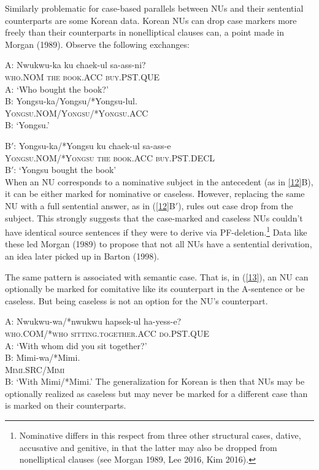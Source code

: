 \documentclass[output=paper
                ,modfonts
                ,nonflat
	        ,collection
	        ,collectionchapter
	        ,collectiontoclongg
 	        ,biblatex
                ,babelshorthands
                ,newtxmath
                ,draftmode
                ,colorlinks, citecolor=brown
]{./langsci/langscibook}
\begin{document}
{Similarly problematic for case-based parallels between NUs and their sentential counterparts are some Korean data. Korean NUs can drop case markers more freely than their counterparts in nonelliptical clauses can, a point made in Morgan (1989). Observe the following exchanges:

  \ea
A: \gll Nwukwu-ka ku  chaek-ul  sa-ass-ni?\\
\textsc{who.NOM} \textsc{the} \textsc{book.ACC} \textsc{buy.PST.QUE}\\
\glt A: `Who bought the book?'\\

B: \gll Yongsu-ka/Yongsu/*Yongsu-lul.\\
\textsc{Yongsu.NOM/Yongsu/*Yongsu.ACC}\\
\glt B: `Yongsu.'

B$'$: \gll Yongsu-ka/*Yongsu  ku  chaek-ul  sa-ass-e\\
\textsc{Yongsu.NOM/*Yongsu} \textsc{the} \textsc{book.ACC} \textsc{buy.PST.DECL}\\
\glt B$'$: `Yongsu bought the book'\\
\label{12}\z
%
When an NU corresponds to a nominative subject in the antecedent (as in \ref{12}B), it can be either marked for nominative or caseless.
However, replacing the same NU with a full sentential answer, as in (\ref{12}B$'$), rules out case drop from the subject. This strongly suggests that the case-marked and caseless NUs couldn't have identical source sentences if they were to derive via PF-deletion.\footnote{Nominative differs in this respect from three other structural cases, dative, accusative and genitive, in that the latter may also be dropped from nonelliptical clauses (see Morgan 1989, Lee 2016, Kim 2016).}  Data like these led Morgan (1989) to propose that not all NUs have a sentential derivation, an idea later picked up in Barton (1998).

The same pattern is associated with semantic case. That is, in (\ref{13}), an NU can optionally be marked for comitative like its counterpart in the A-sentence or be caseless. But being caseless is not an option for the NU's counterpart.

\ea
A: \gll Nwukwu-wa/*nwukwu  hapsek-ul ha-yess-e?\\
\textsc{who.COM/*who}  \textsc{sitting.together.ACC} \textsc{do.PST.QUE}\\
\glt A: `With whom did you sit together?'\\

B: \gll Mimi-wa/*Mimi.\\
\textsc{Mimi.SRC/Mimi}\\
\glt B: `With Mimi/*Mimi.' \label{13}\z
The generalization for Korean is then that NUs may be optionally realized as caseless but may never be marked for a different case than is marked on their counterparts.

}
\end{document}
